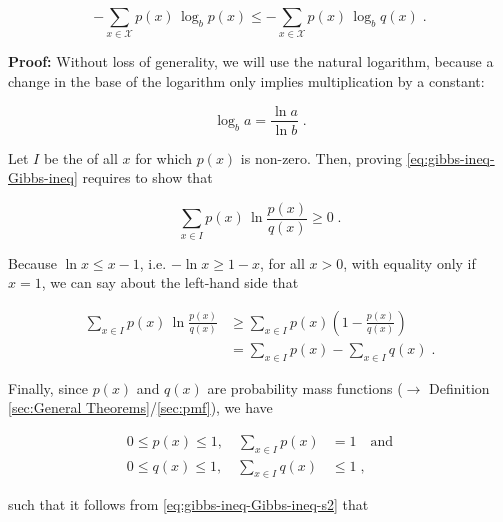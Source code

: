 \documentclass[a4paper,12pt,twoside]{book}
\begin{document}
\begin{equation} \label{eq:gibbs-ineq-Gibbs-ineq}
- \sum_{x \in \mathcal{X}} p(x) \, \log_b p(x) \leq - \sum_{x \in \mathcal{X}} p(x) \, \log_b q(x) \; .
\end{equation}


\vspace{1em}
\textbf{Proof:} Without loss of generality, we will use the natural logarithm, because a change in the base of the logarithm only implies multiplication by a constant:

\begin{equation} \label{eq:gibbs-ineq-log-ln}
\log_b a = \frac{\ln a}{\ln b} \; .
\end{equation}

Let $I$ be the of all $x$ for which $p(x)$ is non-zero. Then, proving \eqref{eq:gibbs-ineq-Gibbs-ineq} requires to show that

\begin{equation} \label{eq:gibbs-ineq-Gibbs-ineq-s1}
\sum_{x \in I} p(x) \, \ln \frac{p(x)}{q(x)} \geq 0 \; .
\end{equation}

Because $\ln x \leq x - 1$, i.e. $-\ln x \geq 1 - x$, for all $x > 0$, with equality only if $x = 1$, we can say about the left-hand side that

\begin{equation} \label{eq:gibbs-ineq-Gibbs-ineq-s2}
\begin{split}
\sum_{x \in I} p(x) \, \ln \frac{p(x)}{q(x)} &\geq \sum_{x \in I} p(x) \left( 1 - \frac{p(x)}{q(x)} \right) \\
&= \sum_{x \in I} p(x) - \sum_{x \in I} q(x) \; .
\end{split}
\end{equation}

Finally, since $p(x)$ and $q(x)$ are probability mass functions ($\rightarrow$ Definition \ref{sec:General Theorems}/\ref{sec:pmf}), we have

\begin{equation} \label{eq:gibbs-ineq-p-q-pmf}
\begin{split}
0 \leq p(x) \leq 1, \quad \sum_{x \in I} p(x) &= 1 \quad \text{and} \\
0 \leq q(x) \leq 1, \quad \sum_{x \in I} q(x) &\leq 1 \; ,
\end{split}
\end{equation}

such that it follows from \eqref{eq:gibbs-ineq-Gibbs-ineq-s2} that
\end{document}
